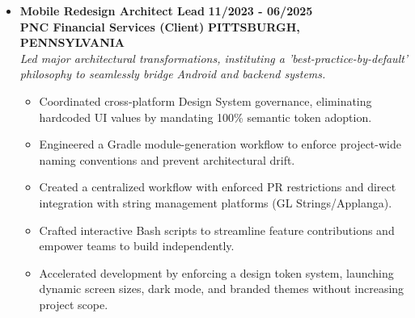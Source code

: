 \documentclass[10pt,letterpaper]{article}
\begin{document}
\begin{itemize}[label={}, leftmargin=0pt, itemsep=6pt, parsep=0pt]
\item{
\textbf{\ttfamily\normalsize Mobile Redesign Architect Lead} \hfill \textbf{\ttfamily\normalsize\color{color1} 11/2023 - 06/2025}\\
\textbf{\ttfamily\small\color{color1} PNC Financial Services (Client)} \hfill \textbf{\ttfamily\small\color{color1} PITTSBURGH, PENNSYLVANIA}\vspace{2pt}\\
{\itshape\sffamily Led major architectural transformations, instituting a 'best-practice-by-default' philosophy to seamlessly bridge Android and backend systems.}\vspace{2pt}
\begin{itemize}[label=\textbullet, leftmargin=15pt, itemsep=1pt, parsep=0pt]
    \item {\sffamily Coordinated cross-platform Design System governance, eliminating hardcoded UI values by mandating 100\% semantic token adoption.}
    \item {\sffamily Engineered a Gradle module-generation workflow to enforce project-wide naming conventions and prevent architectural drift.}
    \item {\sffamily Created a centralized workflow with enforced PR restrictions and direct integration with string management platforms (GL Strings/Applanga).}
    \item {\sffamily Crafted interactive Bash scripts to streamline feature contributions and empower teams to build independently.}
    \item {\sffamily Accelerated development by enforcing a design token system, launching dynamic screen sizes, dark mode, and branded themes without increasing project scope.}
\end{itemize}
}


\end{itemize}
\end{document}
